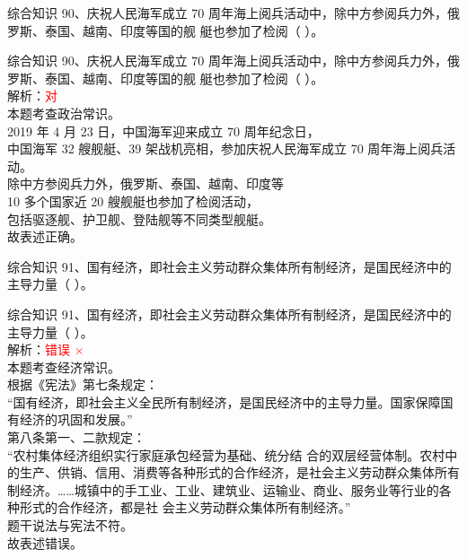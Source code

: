 \documentclass[aspectratio=169]{beamer}
\begin{document}
\begin{frame}[t]{综合知识}
    90、庆祝人民海军成立 70 周年海上阅兵活动中，除中方参阅兵力外，俄罗斯、泰国、越南、印度等国的舰
    艇也参加了检阅（ ）。
\end{frame}                           

\begin{frame}[t]{综合知识}
    90、庆祝人民海军成立 70 周年海上阅兵活动中，除中方参阅兵力外，俄罗斯、泰国、越南、印度等国的舰
    艇也参加了检阅（ ）。\\
    解析：\textcolor{red}{对 \checkmark}\\
    本题考查政治常识。\\
    2019 年 4 月 23 日，中国海军迎来成立 70 周年纪念日，\\
    中国海军 32 艘舰艇、39 架战机亮相，参加庆祝人民海军成立 70 周年海上阅兵活动。\\
    除中方参阅兵力外，俄罗斯、泰国、越南、印度等\\
    10 多个国家近 20 艘舰艇也参加了检阅活动，\\
    包括驱逐舰、护卫舰、登陆舰等不同类型舰艇。\\
    故表述正确。\\
\end{frame}                           


\begin{frame}[t]{综合知识}
    91、国有经济，即社会主义劳动群众集体所有制经济，是国民经济中的主导力量（ ）。
\end{frame}                           

\begin{frame}[t]{综合知识}
    91、国有经济，即社会主义劳动群众集体所有制经济，是国民经济中的主导力量（ ）。\\
    解析：\textcolor{red}{错误 $\times$}\\
    本题考查经济常识。\\
    根据《宪法》第七条规定：\\
    “国有经济，即社会主义全民所有制经济，是国民经济中的主导力量。国家保障国有经济的巩固和发展。”\\
    第八条第一、二款规定：\\
    “农村集体经济组织实行家庭承包经营为基础、统分结
    合的双层经营体制。农村中的生产、供销、信用、消费等各种形式的合作经济，是社会主义劳动群众集体所有
    制经济。……城镇中的手工业、工业、建筑业、运输业、商业、服务业等行业的各种形式的合作经济，都是社
    会主义劳动群众集体所有制经济。”\\
    题干说法与宪法不符。\\
    故表述错误。\\
\end{frame}                           
\end{document}
